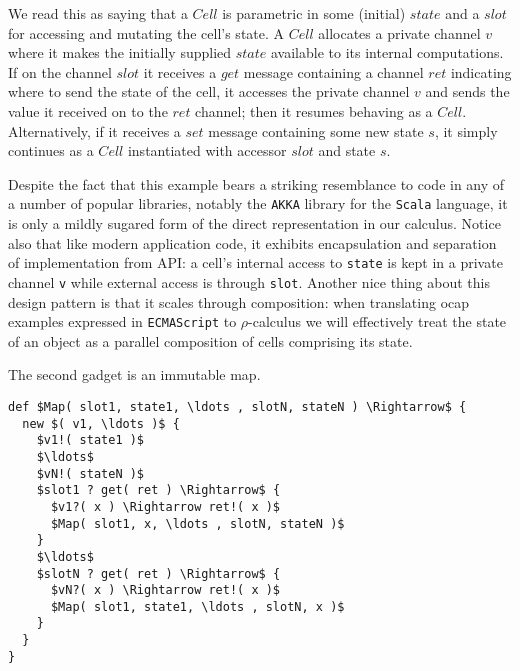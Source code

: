 \documentclass[]{amsart}
\theoremstyle{definition}
\theoremstyle{remark}
\numberwithin{equation}{subsection}
\newcommand{\rhoc}{$\rho$-calculus}
\begin{document}

We read this as saying that a $Cell$ is parametric in some (initial)
$state$ and a $slot$ for accessing and mutating the cell's state. A
$Cell$ allocates a private channel $v$ where it makes the initially
supplied $state$ available to its internal computations. If on the
channel $slot$ it receives a $get$ message containing a channel $ret$
indicating where to send the state of the cell, it accesses the
private channel $v$ and sends the value it received on to the $ret$
channel; then it resumes behaving as a $Cell$. Alternatively, if it
receives a $set$ message containing some new state $s$, it simply
continues as a $Cell$ instantiated with accessor $slot$ and state $s$.

Despite the fact that this example bears a striking resemblance to code
in any of a number of popular libraries, notably the {\tt AKKA}
library for the {\tt Scala} language, it is only a mildly sugared
form of the direct representation in our calculus. Notice also that
like modern application code, it exhibits encapsulation and separation
of implementation from API: a cell's internal access to
{\tt state} is kept in a private channel {\tt v} while
external access is through {\tt slot}. Another nice thing about
this design pattern is that it scales through composition: when
translating ocap examples expressed in {\tt ECMAScript} to \rhoc\;
we will effectively treat the state of an object as a parallel
composition of cells comprising its state.

The second gadget is an immutable map.

\begin{lstlisting}[mathescape]
def $Map( slot1, state1, \ldots , slotN, stateN ) \Rightarrow$ {
  new $( v1, \ldots )$ {
    $v1!( state1 )$
    $\ldots$
    $vN!( stateN )$
    $slot1 ? get( ret ) \Rightarrow$ { 
      $v1?( x ) \Rightarrow ret!( x )$
      $Map( slot1, x, \ldots , slotN, stateN )$
    }
    $\ldots$
    $slotN ? get( ret ) \Rightarrow$ { 
      $vN?( x ) \Rightarrow ret!( x )$
      $Map( slot1, state1, \ldots , slotN, x )$
    }
  }
}
\end{lstlisting}
\end{document}

